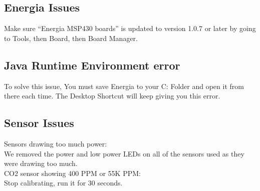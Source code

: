 \renewcommand{\thesubsection}{2.\arabic{subsection}}
\subsection{Energia Issues}
Make sure “Energia MSP430 boards” is updated to version 1.0.7 or later by going to Tools, then Board, then Board Manager.
\subsection{Java Runtime Environment error}

To solve this issue, You must save Energia to your C: Folder and open it from there each time. The Desktop Shortcut will keep giving you this error. 

\subsection{Sensor Issues}
Sensors drawing too much power:
\\We removed the power and low power LEDs on all of the sensors used as they were drawing too much.
\\CO2 sensor showing 400 PPM or 55K PPM:
\\Stop calibrating, run it for 30 seconds. 
